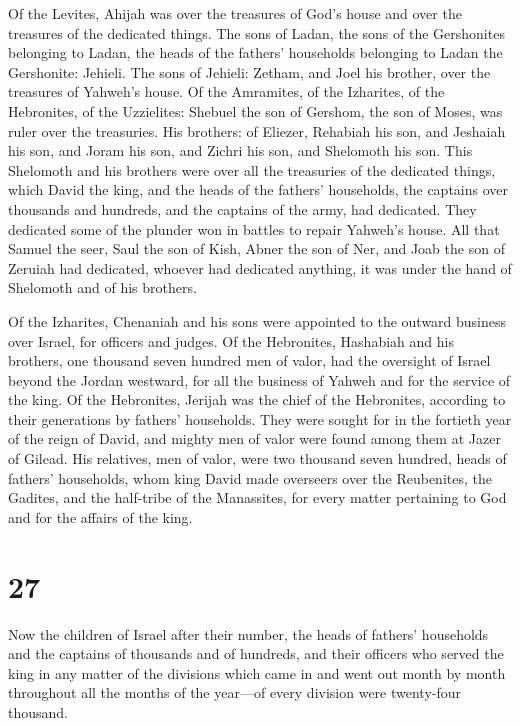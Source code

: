  Of the Levites, Ahijah was over the treasures of God's
house and over the treasures of the dedicated things. 
The sons of Ladan, the sons of the Gershonites belonging to Ladan, the
heads of the fathers' households belonging to Ladan the Gershonite:
Jehieli.  The sons of Jehieli: Zetham, and Joel his
brother, over the treasures of Yahweh's house.  Of the
Amramites, of the Izharites, of the Hebronites, of the Uzzielites:
 Shebuel the son of Gershom, the son of Moses, was ruler
over the treasuries.  His brothers: of Eliezer, Rehabiah
his son, and Jeshaiah his son, and Joram his son, and Zichri his son,
and Shelomoth his son.  This Shelomoth and his brothers
were over all the treasuries of the dedicated things, which David the
king, and the heads of the fathers' households, the captains over
thousands and hundreds, and the captains of the army, had dedicated.
 They dedicated some of the plunder won in battles to
repair Yahweh's house.  All that Samuel the seer, Saul
the son of Kish, Abner the son of Ner, and Joab the son of Zeruiah had
dedicated, whoever had dedicated anything, it was under the hand of
Shelomoth and of his brothers.

 Of the Izharites, Chenaniah and his sons were appointed
to the outward business over Israel, for officers and judges.
 Of the Hebronites, Hashabiah and his brothers, one
thousand seven hundred men of valor, had the oversight of Israel beyond
the Jordan westward, for all the business of Yahweh and for the service
of the king.  Of the Hebronites, Jerijah was the chief of
the Hebronites, according to their generations by fathers' households.
They were sought for in the fortieth year of the reign of David, and
mighty men of valor were found among them at Jazer of Gilead.
 His relatives, men of valor, were two thousand seven
hundred, heads of fathers' households, whom king David made overseers
over the Reubenites, the Gadites, and the half-tribe of the Manassites,
for every matter pertaining to God and for the affairs of the king.

\hypertarget{section-26}{%
\section{27}\label{section-26}}

 Now the children of Israel after their number, the heads
of fathers' households and the captains of thousands and of hundreds,
and their officers who served the king in any matter of the divisions
which came in and went out month by month throughout all the months of
the year---of every division were twenty-four thousand.

